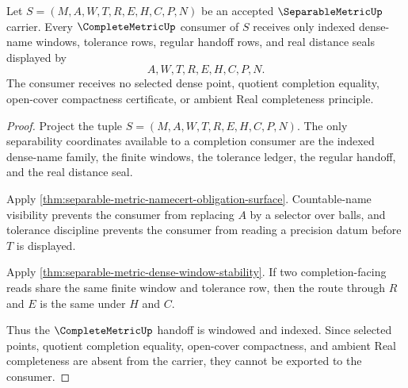 \begin{theorem}
\label{thm:separable-metric-completion-consumer-handoff}
Let $S=(M,A,W,T,R,E,H,C,P,N)$ be an accepted $\SeparableMetricUp$ carrier. Every $\CompleteMetricUp$ consumer of $S$ receives only indexed dense-name windows, tolerance rows, regular handoff rows, and real distance seals displayed by
$$
A,W,T,R,E,H,C,P,N .
$$
The consumer receives no selected dense point, quotient completion equality, open-cover compactness certificate, or ambient Real completeness principle.
\end{theorem}
\begin{proof}
Project the tuple $S=(M,A,W,T,R,E,H,C,P,N)$. The only separability coordinates available to a completion consumer are the indexed dense-name family, the finite windows, the tolerance ledger, the regular handoff, and the real distance seal.

Apply \autoref{thm:separable-metric-namecert-obligation-surface}. Countable-name visibility prevents the consumer from replacing $A$ by a selector over balls, and tolerance discipline prevents the consumer from reading a precision datum before $T$ is displayed.

Apply \autoref{thm:separable-metric-dense-window-stability}. If two completion-facing reads share the same finite window and tolerance row, then the route through $R$ and $E$ is the same under $H$ and $C$.

Thus the $\CompleteMetricUp$ handoff is windowed and indexed. Since selected points, quotient completion equality, open-cover compactness, and ambient Real completeness are absent from the carrier, they cannot be exported to the consumer.
\end{proof}

